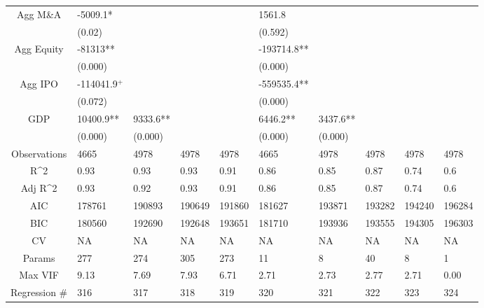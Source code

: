 \documentclass{article}
\begin{document}
\begin{table}[H]
\begin{tabular}{|clllllllll|}
  Agg M\&A & -5009.1* &  &  &  & 1561.8 &  &  &  &  \\ 
   & (0.02) &  &  &  & (0.592) &  &  &  &  \\ 
  Agg Equity & -81313** &  &  &  & -193714.8** &  &  &  &  \\ 
   & (0.000) &  &  &  & (0.000) &  &  &  &  \\ 
  Agg IPO & -114041.9$^{+}$ &  &  &  & -559535.4** &  &  &  &  \\ 
   & (0.072) &  &  &  & (0.000) &  &  &  &  \\ 
  GDP & 10400.9** & 9333.6** &  &  & 6446.2** & 3437.6** &  &  &  \\ 
   & (0.000) & (0.000) &  &  & (0.000) & (0.000) &  &  &  \\ 
  \hline 
 Observations & 4665 & 4978 & 4978 & 4978 & 4665 & 4978 & 4978 & 4978 & 4978 \\ 
  R^2 & 0.93 & 0.93 & 0.93 & 0.91 & 0.86 & 0.85 & 0.87 & 0.74 & 0.6 \\ 
  Adj R^2 & 0.93 & 0.92 & 0.93 & 0.91 & 0.86 & 0.85 & 0.87 & 0.74 & 0.6 \\ 
  AIC & 178761 & 190893 & 190649 & 191860 & 181627 & 193871 & 193282 & 194240 & 196284 \\ 
  BIC & 180560 & 192690 & 192648 & 193651 & 181710 & 193936 & 193555 & 194305 & 196303 \\ 
  CV & NA & NA & NA & NA & NA & NA & NA & NA & NA \\ 
  Params & 277 & 274 & 305 & 273 & 11 & 8 & 40 & 8 & 1 \\ 
  Max VIF & 9.13 & 7.69 & 7.93 & 6.71 & 2.71 & 2.73 & 2.77 & 2.71 & 0.00 \\ 
  Regression \# & 316 & 317 & 318 & 319 & 320 & 321 & 322 & 323 & 324 \\ 
   \hline
\end{tabular}
 
\end{table}
\end{document}
